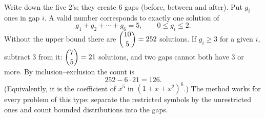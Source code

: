 Write down the five $2$'s; they create $6$ gaps (before, between and after). Put $g_i$ ones in gap $i$. A valid number corresponds to exactly one solution of
\[
g_1+g_2+\cdots+g_6=5,\qquad 0\le g_i\le2 .
\]
Without the upper bound there are $\dbinom{10}{5}=252$ solutions. If $g_i\ge3$ for a given $i$, subtract $3$ from it: $\dbinom{7}{5}=21$ solutions, and two gaps cannot both have $3$ or more. By inclusion--exclusion the count is
\[
252-6\cdot21=\boxed{126}.
\]
(Equivalently, it is the coefficient of $x^5$ in $(1+x+x^2)^6$.) The method works for every problem of this type: separate the restricted symbols by the unrestricted ones and count bounded distributions into the gaps.
